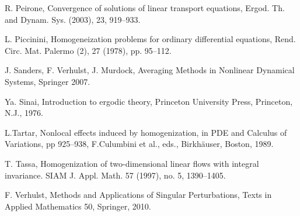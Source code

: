 \documentclass[10pt]{amsart}
\theoremstyle{definition}                                                                                  \newtheorem{remark}[theorem]{Remark}
\theoremstyle{theorem}
\begin{document}
\begin{thebibliography}{1}
 R. Peirone, Convergence of solutions of linear transport equations, 
Ergod. Th. and Dynam. Sys. (2003), 23, 919--933.

 L. Piccinini, Homogeneization problems for ordinary differential equations, Rend. Circ. Mat. Palermo (2), 27 (1978), pp. 95--112.

 J. Sanders, F. Verhulst, J. Murdock, 
Averaging Methods in Nonlinear Dynamical Systems,
 Springer 2007.

 Ya. Sinai,
Introduction to ergodic theory,  Princeton University Press, Princeton, N.J., 1976.

 L.Tartar, Nonlocal effects induced by homogenization, in PDE and 
Calculus of Variations, pp 925--938, F.Culumbini et al., eds., Birkh\"auser, Boston, 1989.

 T. Tassa, 
Homogenization of two-dimensional linear flows with integral invariance. 
SIAM J. Appl. Math. 57 (1997), no. 5, 1390--1405. 

 F. Verhulst,
Methods and Applications of Singular Perturbations, Texts in Applied Mathematics 50, Springer, 2010.
\end{thebibliography}
\end{document}
